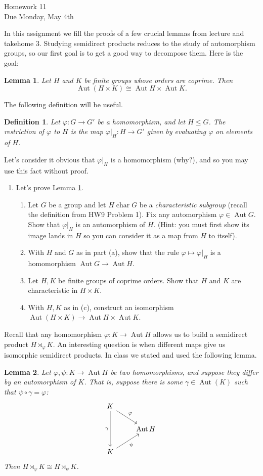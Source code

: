 \documentclass[11pt]{article}
\newtheorem{lemma}{Lemma}
\newtheorem{definition}{Definition}
\newcommand{\Aut}{\operatorname{Aut}}
\newcommand{\ch}{\operatorname{char}}
\begin{document}
\begin{center}
\Large {Homework 11}\\
\small {Due Monday, May 4th}
\end{center}
In this assignment we fill the proofs of a few crucial lemmas from lecture and takehome 3.  Studying semidirect products reduces to the study of automorphism groups, so our first goal is to get a good way to decompose them.  Here is the goal:
\begin{lemma}\label{autDecomp}
  Let $H$ and $K$ be finite groups whose orders are coprime.  Then \[\Aut(H\times K)\cong\Aut H\times \Aut K.\]
\end{lemma}
The following definition will be useful.
\begin{definition}
  Let $\varphi:G\to G'$ be a homomorphism, and let $H\le G$.  The \textit{restriction of} $\varphi$ \textit{to }$H$ is the map $\varphi|_H:H\to G'$ given by evaluating $\varphi$ on elements of $H$.
\end{definition}
Let's consider it obvious that $\varphi|_H$ is a homomorphism (why?), and so you may use this fact without proof.
\begin{enumerate}
  \item{
  Let's prove Lemma \ref{autDecomp}.
  \begin{enumerate}
    \item{
    Let $G$ be a group and let $H\ch G$ be a \textit{characteristic subgroup} (recall the definition from HW9 Problem 1).  Fix any automorphism $\varphi\in\Aut G$. Show that $\varphi|_H$ is an automorphism of $H$.  (Hint: you must first show its image lands in $H$ so you can consider it as a map from $H$ to itself).
    }
    \item{
    With $H$ and $G$ as in part (a), show that the rule $\varphi\mapsto\varphi|_H$ is a homomorphism $\Aut G\to\Aut H$.
    }
    \item{
    Let $H,K$ be finite groups of coprime orders.  Show that $H$ and $K$ are characteristic in $H\times K$.
    }
    \item{
    With $H,K$ as in (c), construct an isomorphism $\Aut(H\times K)\to\Aut H\times\Aut K$.
    }
  \end{enumerate}
  }
\end{enumerate}
Recall that any homomorphism $\varphi:K\to\Aut H$ allows us to build a semidirect product $H\rtimes_\varphi K$.  An interesting question is when different maps give us isomorphic semidirect products.  In class we stated and used the following lemma.
\begin{lemma}\label{leftSemidirect}
  Let $\varphi,\psi:K\to\Aut H$ be two homomorphisms, and suppose they differ by an automorphism of $K$.  That is, suppose there is some $\gamma\in\Aut(K)$ such that $\psi\circ\gamma = \varphi$:
  \[
  \begin{tikzcd}
    K\ar[dr,"\varphi"]\ar[dd,swap,"\gamma"] & \\
     & \Aut H\\
    K\ar[ur,swap, "\psi"] &
  \end{tikzcd}
  \]
  Then $H\rtimes_\varphi K\cong H\rtimes_\psi K$.
\end{lemma}
\end{document}
